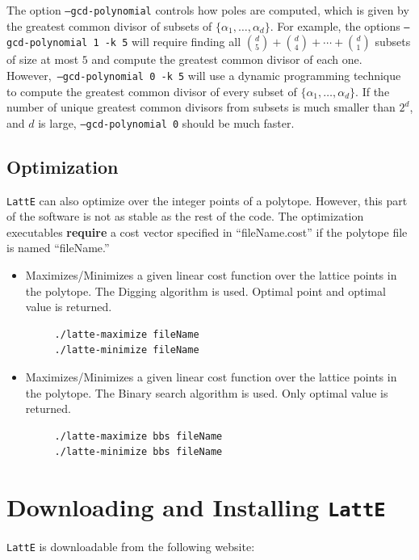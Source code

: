 \documentclass{article}
\newcommand{\latte}{{\tt LattE}\xspace}
\begin{document}
The option {\tt --gcd-polynomial} controls how poles are computed, which is given by the greatest common divisor of subsets of $\{\alpha_1 , \dots, \alpha_d\}$. For example, the options {\tt --gcd-polynomial 1 -k 5} will require finding all $\binom{d}{5}+\binom{d}{4}+\cdots+\binom{d}{1}$ subsets of size at most $5$ and compute the greatest common divisor of each one. However,~{\tt --gcd-polynomial 0 -k 5} will use a dynamic programming technique to compute the greatest common divisor of every subset of $\{\alpha_1 , \dots, \alpha_d\}$. If the number of unique greatest common divisors from subsets is much smaller than $2^d$, and $d$ is large, {\tt --gcd-polynomial 0} should be much faster. 


\subsection{Optimization}


\latte can also optimize over the integer points of a polytope. However, this part of the software is not as stable as the rest of the code. The optimization executables {\bf require} a cost vector specified in ``fileName.cost'' if the polytope file is named ``fileName.''

\begin{itemize}
\item Maximizes/Minimizes a given linear cost function over the lattice
  points in the polytope. The Digging algorithm
  \cite{latte3} is used. Optimal point and optimal value is returned. 
\begin{verbatim}
     ./latte-maximize fileName
     ./latte-minimize fileName
\end{verbatim} 
\item Maximizes/Minimizes a given linear cost function over the lattice
  points in the polytope. The Binary search
  algorithm is used. Only optimal value is returned. 
\begin{verbatim}
     ./latte-maximize bbs fileName
     ./latte-minimize bbs fileName
\end{verbatim} 
\end{itemize}




\section{Downloading and Installing {\tt LattE}}

{\tt LattE} is downloadable from the following website:
\end{document}
